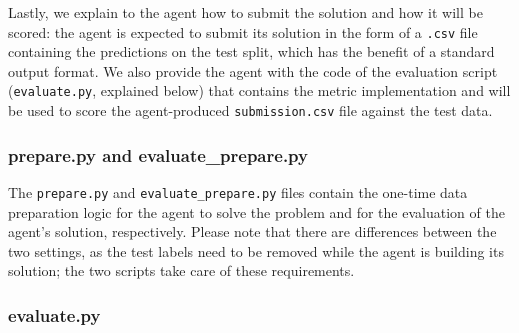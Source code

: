\documentclass{fairmeta}
\newcommand{\airsbench}{\textsc{AIRS-Bench}}
\begin{document}
Lastly, we explain to the agent how to submit the solution and how it will be scored:
the agent is expected to submit its solution in the form of a \texttt{.csv} file containing the predictions on the test split, which has the benefit of a standard output format.
We also provide the agent with the code of the evaluation script (\texttt{evaluate.py}, explained below) that contains the metric implementation and will be used to score the agent-produced \texttt{submission.csv} file against the test data.


\subsubsection{prepare.py and evaluate\_prepare.py}
\label{sec:prepare.py}

The \texttt{prepare.py} and \texttt{evaluate\_prepare.py} files contain the one-time data preparation logic for the agent to solve the problem and for the evaluation of the agent's solution, respectively. Please note that there are differences between the two settings, as the test labels need to be removed while the agent is building its solution; the two scripts take care of these requirements.

\subsubsection{evaluate.py}
\label{sec:evaluate.py}



\end{document}
